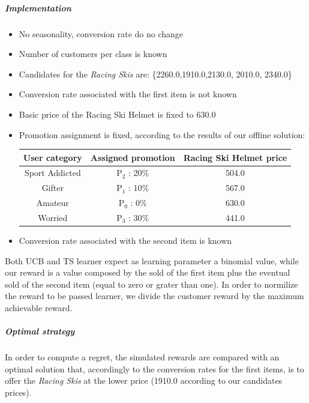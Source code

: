 \subparagraph{Implementation} 
\begin{itemize}
	\item No seasonality, conversion rate do no change
	\item Number of customers per class is known 
	\item Candidates for the \textit{Racing Skis} are: \{2260.0,1910.0,2130.0, 2010.0, 2340.0\}
	\item Conversion rate associated with the first item is not known
	\item Basic price of the Racing Ski Helmet is fixed to 630.0
	\item Promotion assignment is fixed, according to the results of our offline solution: 
	\begin{center}
		\begin{tabular}{ |c|c|c|} 
		\hline
		User category & Assigned promotion & Racing Ski Helmet price \\
		\hline
		Sport Addicted & P$_2$ : 20\% & 504.0 \\
		\hline
		Gifter & P$_1$ : 10\% & 567.0 \\
		\hline
		Amateur & P$_0$ : 0\% & 630.0 \\
		\hline
		Worried & P$_3$ : 30\% & 441.0 \\
		\hline
		\end{tabular}
	\end{center}
	\item Conversion rate associated with the second item is known
\end{itemize}

Both UCB and TS learner expect as learning parameter a binomial value, while our reward is a value composed by the sold of the first item plus the eventual sold of the second item (equal to zero or grater than one). In order to normilize the reward to be passed learner, we divide the customer reward by the maximum achievable reward.   

\subparagraph{Optimal strategy}In order to compute a regret, the simulated rewards are compared with an optimal solution that, accordingly to the conversion rates for the first items, is to offer the \textit{Racing Skis} at the lower price (1910.0 according to our candidates prices). 

